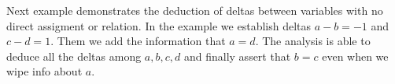 Next example demonstrates the deduction of deltas between variables with
no direct assigment or relation. In the example we establish deltas
$a-b=-1$ and $c-d = 1$. Them we add the information that $a=d$. The
analysis is able to deduce all the deltas among $a,b,c,d$ and finally
assert that $b=c$ even when we wipe info about $a$.

